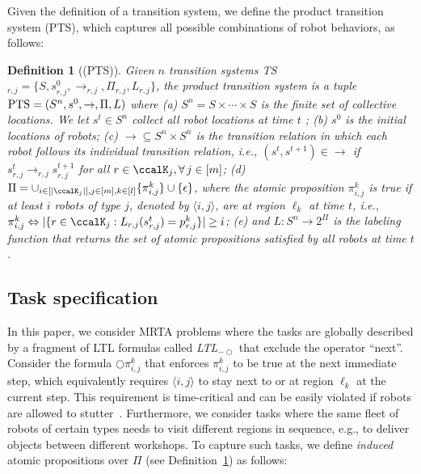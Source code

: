 \documentclass[Afour,sageh,times]{sagej}
\newtheorem{defn}[thm]{Definition}
\newcommand{\ltl}{ {\it LTL}$_{-\bigcirc}$ }
\newcommand{\ag}[2]{\langle#1,#2\rangle}
\renewcommand{\ap}[3]{\mathcal{\pi}_{{#1},{#2}}^{#3}}
\begin{document}
Given the definition of a transition system, we define the product transition system (PTS), which captures all possible combinations of robot behaviors, as follows:
\begin{defn}[(PTS)]\label{def:pts}
  Given $n$ transition systems \textup{TS}$_{r,j} = \{S, s_{r,j}^0, \to_{r,j}, \Pi_{r,j}, L_{r,j}\}$, the product transition system  is a tuple $\textup{PTS} = (S^n, s^0, \to, \Pi, L)$ where (a) $S^n = S\times \cdots \times S$ is the finite set of collective locations. We let $s^t \in S^n$ collect all robot locations at time $t$%
  ; (b) $s^0$ is the initial locations of robots; (c) $\to \subseteq S^n \times S^n$ is the transition relation in which each robot follows its individual transition relation, i.e., $(s^t, s^{t+1}) \in \to$ if $s^t_{r,j}\rightarrow_{r,j} s^{t+1}_{r,j}$ for all $r\in \ccalK_j, \forall \,j \in [m]$;
  (d) $\Pi = \cup_{i\in[|\ccalK_j|], j\in [m], k\in [l]}\{\pi_{i,j}^k\} \cup \{\epsilon\}$, where the atomic proposition $\ap{i}{j}{k}$ is true if at least $i$ robots of type $j$, denoted by $\ag{i}{j}$, are at region $\ell_k$ at time $t$, i.e., $\ap{i}{j}{k} \Leftrightarrow |\{r\in \ccalK_j: L_{r,j}(s_{r,j}^t) = p_{r,j}^k \}| \geq i$; (e) and $L: S^n \to 2^{\Pi}$ is the labeling function that returns the set of atomic propositions satisfied by all robots at time $t$.
\end{defn}
\subsection{Task specification}
In this paper, we consider MRTA problems where the tasks are globally described by a fragment of LTL formulas called \ltl that exclude the operator ``next''. Consider the formula $\bigcirc \ap{i}{j}{k}$ that enforces $\ap{i}{j}{k}$ to be true at the next immediate step, which equivalently requires $\langle i,j \rangle$ to stay next to or at region $\ell_k$ at the current step. This requirement is time-critical and can be easily violated if robots are allowed to stutter~\citep{sahin2019multirobot}. Furthermore, we consider tasks where the same fleet of robots of certain types needs to visit different regions in sequence, e.g., to deliver objects between different workshops. To capture such tasks, we  define {\it induced} atomic propositions over $\Pi$ (see Definition~\ref{def:pts})  as follows:
\end{document}
